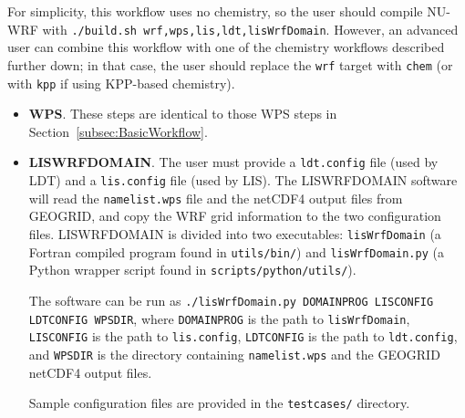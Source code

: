 For simplicity, this workflow uses no chemistry,  so the user should compile 
NU-WRF with \texttt{./build.sh wrf,wps,lis,ldt,lisWrfDomain}. However, an 
advanced user can combine this workflow with one of the chemistry workflows 
described further down; in that case, the user should replace the \texttt{wrf}
target with \texttt{chem} (or with \texttt{kpp} if using KPP-based chemistry).

\begin{itemize}
\item \textbf{WPS}. These steps are identical to those WPS steps in 
Section~\ref{subsec:BasicWorkflow}.
\item \textbf{LISWRFDOMAIN}. The user must provide a \texttt{ldt.config} file 
  (used by LDT) and a \texttt{lis.config} file (used by LIS).  The LISWRFDOMAIN 
  software will read the \texttt{namelist.wps} file and the netCDF4 output 
  files from GEOGRID, and copy the WRF grid information to the two 
  configuration files. LISWRFDOMAIN is divided into two executables: 
  \texttt{lisWrfDomain} (a Fortran compiled program found in 
  \texttt{utils/bin/}) and \texttt{lisWrfDomain.py} (a Python wrapper
  script found in \texttt{scripts/python/utils/}).  

  The software can be run as 
  \texttt{./lisWrfDomain.py DOMAINPROG LISCONFIG LDTCONFIG WPSDIR}, 
  where \texttt{DOMAINPROG} is the path to \texttt{lisWrfDomain}, 
  \texttt{LISCONFIG} is the path to \texttt{lis.config},
  \texttt{LDTCONFIG} is the path to \texttt{ldt.config},
  and \texttt{WPSDIR} is the directory containing \texttt{namelist.wps}
  and the GEOGRID netCDF4 output files.

  Sample configuration files are provided in the  \texttt{testcases/} directory.


\end{itemize}
